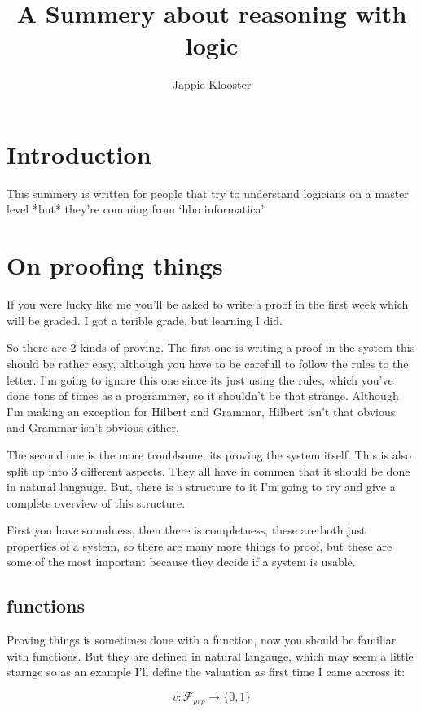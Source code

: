 \documentclass{article}
\begin{document}
\lstset{language=Java}
\author{Jappie Klooster}
\title{A Summery about reasoning with logic}
\maketitle

\section{Introduction}
This summery is written for people that try to understand logicians on a master
level *but* they're comming from `hbo informatica'

\section{On proofing things}
If you were lucky like me you'll be asked to write a proof in the first week
which will be graded. I got a terible grade, but learning I did.

So there are 2 kinds of proving. The first one is writing a proof in the system
this should be rather easy, although you have to be carefull to follow the
rules to the letter. I'm going to ignore this one since its just using the
rules, which you've done tons of times as a programmer, so it shouldn't be
that strange. Although I'm making an exception for Hilbert and Grammar,
Hilbert isn't that obvious and Grammar isn't obvious either.

The second one is the more troublsome, its proving the system itself. This
is also split up into 3 different aspects. They all have in commen that
it should be done in natural langauge. But, there is a structure to it
I'm going to try and give a complete overview of this structure.

First you have soundness, then there is completness, these are both just
properties of a system, so there are many more things to proof, but these
are some of the most important because they decide if a system is usable.

\subsection{functions}
Proving things is sometimes done with a function,
now you should be familiar with functions.
But they are defined in natural langauge, which may seem a little starnge
so as an example I'll define the valuation as first time I came accross it:

\[v:\mathcal{F}_{prp} \to \{0,1\}\]
\end{document}
